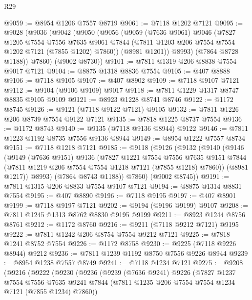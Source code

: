 \begin{lexlean}{R29}
\begin{coremodule}
@9059 := @8954 @1206 @7557 @8719
@9061 := @7118 @1202 @7121
@9095 := @9028
    (@9036
      (@9042
        (@9050
          (@9056
            (@9059
              (@7636 @9061)
              @9046
              (@7827
                @1205
                @7554
                @7556
                @7635
                @9061
                @7844
                (@7811 @1203 @206 @7554 @7554 @1202 @7121 (@7855 @1202) @7860))
              (@8981 @1201))
            @8993)
          (@7864 @8728 @1188))
        @7860)
      (@9002 @8730))
@9101 := @7811 @1319 @206 @8838 @7554 @9017 @7121
@9104 := @8875 @1318 @8836 @7554
@9105 := @407 @8888
@9106 := @7118 @9105
@9107 := @407 @8902
@9109 := @7118 @9107 @7121
@9112 := @9104 (@9106 @9109) @9017
@9118 := @7811 @1229 @1317 @8747 @8835 @9105 @9109
@9121 := @8923 @1228 @8741 @8746
@9122 := @1172 @8745
@9126 := @9121 (@7118 @9122 @7121) @9105
@9132 := @7811 @1226 @206 @8739 @7554 @9122 @7121
@9135 := @7818 @1225 @8737 @7554
@9136 := @1172 @8743
@9140 := @9135 (@7118 @9136 @8944) @9122
@9146 := @7811 @1223 @1192 @8735 @7556 @9136 @8944
@9149 := @8954 @1222 @7557 @8734
@9151 := @7118 @1218 @7121
@9185 := @9118
    (@9126
      (@9132
        (@9140
          (@9146
            (@9149
              (@7636 @9151)
              @9136
              (@7827
                @1221
                @7554
                @7556
                @7635
                @9151
                @7844
                (@7811 @1219 @206 @7554 @7554 @1218 @7121 (@7855 @1218) @7860))
              (@8981 @1217))
            @8993)
          (@7864 @8743 @1188))
        @7860)
      (@9002 @8745))
@9191 := @7811 @1315 @206 @8833 @7554 @9107 @7121
@9194 := @8875 @1314 @8831 @7554
@9195 := @407 @8890
@9196 := @7118 @9195
@9197 := @407 @8901
@9199 := @7118 @9197 @7121
@9202 := @9194 (@9196 @9199) @9107
@9208 := @7811 @1245 @1313 @8762 @8830 @9195 @9199
@9211 := @8923 @1244 @8756 @8761
@9212 := @1172 @8760
@9216 := @9211 (@7118 @9212 @7121) @9195
@9222 := @7811 @1242 @206 @8754 @7554 @9212 @7121
@9225 := @7818 @1241 @8752 @7554
@9226 := @1172 @8758
@9230 := @9225 (@7118 @9226 @8944) @9212
@9236 := @7811 @1239 @1192 @8750 @7556 @9226 @8944
@9239 := @8954 @1238 @7557 @8749
@9241 := @7118 @1234 @7121
@9275 := @9208
    (@9216
      (@9222
        (@9230
          (@9236
            (@9239
              (@7636 @9241)
              @9226
              (@7827
                @1237
                @7554
                @7556
                @7635
                @9241
                @7844
                (@7811 @1235 @206 @7554 @7554 @1234 @7121 (@7855 @1234) @7860))

\end{coremodule}
\end{lexlean}
